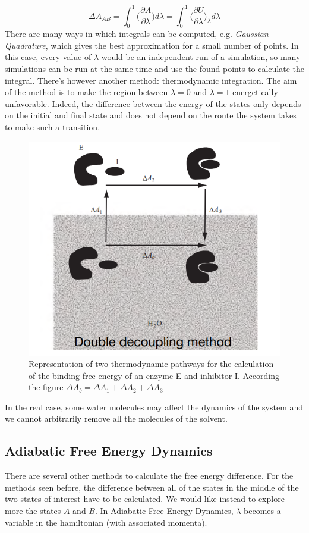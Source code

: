 	$$\Delta A_{AB} = \int_0^1\biggl(\frac{\partial A}{\partial \lambda}\biggr)d\lambda = \int_0^1\biggl\langle\frac{\partial U}{\partial\lambda}\biggr\rangle_\lambda d\lambda$$
	There are many ways in which integrals can be computed, e.g. \textit{Gaussian Quadrature}, which gives the best approximation for a small number of points.
	In this case, every value of $\lambda$ would be an independent run of a simulation, so many simulations can be run at the same time and use the found points to calculate the integral. 
	There's however another method: thermodynamic integration.
	The aim of the method is to make the region between $\lambda=0$ and $\lambda=1$ energetically unfavorable.
	Indeed, the difference between the energy of the states only depends on the initial and final state and does not depend on the route the system takes to make such a transition.
	\begin{figure}[H]
		\centering
		\includegraphics[scale=0.5]{ddm.png}
		\caption{Representation of two thermodynamic pathways for the calculation of the binding free energy of an enzyme E and inhibitor I. According the figure $\Delta A_b = \Delta A_1 + \Delta A_2 + \Delta A_3$}
		\label{fig:ddm}
	\end{figure}
	
	In the real case, some water molecules may affect the dynamics of the system and we cannot arbitrarily remove all the molecules of the solvent.
	
	\subsection{Adiabatic Free Energy Dynamics}
	There are several other methods to calculate the free energy difference.
	For the methods seen before, the difference between all of the states in the middle of the two states of interest have to be calculated.
	We would like instead to explore more the states $A$ and $B$.
	In Adiabatic Free Energy Dynamics, $\lambda$ becomes a variable in the hamiltonian (with associated momenta).

